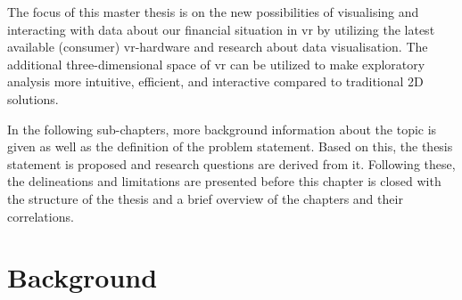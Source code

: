 The focus of this master thesis is on the new possibilities of visualising and interacting with data about our financial situation in \gls{vr} by utilizing the latest available (consumer) \gls{vr}-hardware and research about data visualisation. The additional three-dimensional space of \gls{vr} can be utilized to make exploratory analysis more intuitive, efficient, and interactive compared to traditional 2D solutions.

In the following sub-chapters, more background information about the topic is given as well as the definition of the problem statement. Based on this, the thesis statement is proposed and research questions are derived from it. Following these, the delineations and limitations are presented before this chapter is closed with the structure of the thesis and a brief overview of the chapters and their correlations.



\section{Background}

